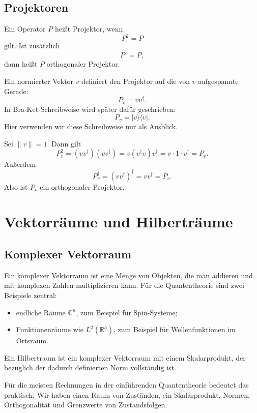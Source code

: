 \subsection{Projektoren}

\begin{definitionbox}
Ein Operator $P$ heißt Projektor, wenn
\[
    P^2=P
\]
gilt. Ist zusätzlich
\[
    P^\dagger=P,
\]
dann heißt $P$ orthogonaler Projektor.
\end{definitionbox}

Ein normierter Vektor $v$ definiert den Projektor auf die von $v$ aufgespannte Gerade:
\[
    P_v = vv^\dagger.
\]
In Bra-Ket-Schreibweise wird später dafür geschrieben:
\[
    P_v = |v\rangle\langle v|.
\]
Hier verwenden wir diese Schreibweise nur als Ausblick.

\begin{calculationbox}
Sei $\|v\|=1$. Dann gilt
\[
    P_v^2=(vv^\dagger)(vv^\dagger)
    =v(v^\dagger v)v^\dagger
    =v\cdot 1\cdot v^\dagger
    =P_v.
\]
Außerdem
\[
    P_v^\dagger=(vv^\dagger)^\dagger=vv^\dagger=P_v.
\]
Also ist $P_v$ ein orthogonaler Projektor.
\end{calculationbox}

\section{Vektorräume und Hilberträume}

\subsection{Komplexer Vektorraum}

Ein komplexer Vektorraum ist eine Menge von Objekten, die man addieren und mit komplexen Zahlen multiplizieren kann. Für die Quantentheorie sind zwei Beispiele zentral:
\begin{itemize}
    \item endliche Räume $\mathbb{C}^n$, zum Beispiel für Spin-Systeme;
    \item Funktionenräume wie $L^2(\mathbb{R}^3)$, zum Beispiel für Wellenfunktionen im Ortsraum.
\end{itemize}

\begin{definitionbox}
Ein Hilbertraum ist ein komplexer Vektorraum mit einem Skalarprodukt, der bezüglich der dadurch definierten Norm vollständig ist.
\end{definitionbox}

Für die meisten Rechnungen in der einführenden Quantentheorie bedeutet das praktisch: Wir haben einen Raum von Zuständen, ein Skalarprodukt, Normen, Orthogonalität und Grenzwerte von Zustandsfolgen.

